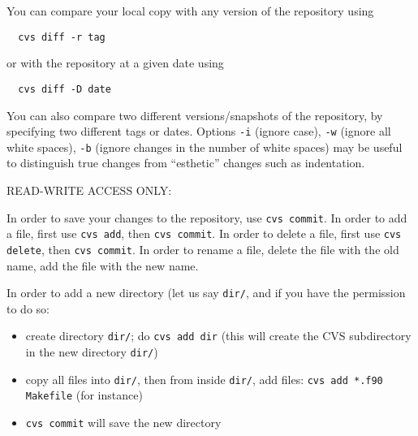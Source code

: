 \documentclass[12pt,a4paper]{article}
\begin{document}
You can compare your local copy with any version of the repository
using 
\begin{verbatim}
  cvs diff -r tag
\end{verbatim}
or with the repository at a given date using 
\begin{verbatim}
  cvs diff -D date
\end{verbatim}
You can also compare two different versions/snapshots of the repository, 
by specifying two different tags or dates. Options \texttt{-i} (ignore case),  
\texttt{-w} (ignore all white spaces), \texttt{-b} (ignore changes in 
the number of white spaces) may be useful to distinguish true changes
from ``esthetic'' changes such as indentation.

READ-WRITE ACCESS ONLY:

In order to save your changes to the repository, use
{\tt cvs commit}. In order to add a file, first use
{\tt cvs add}, then {\tt cvs commit}. In order to delete
a file, first use {\tt cvs delete}, then {\tt cvs commit}.
In order to rename a file, delete the file with the old
name, add the file with the new name.

In order to add a new directory (let us say {\tt dir/}, 
and if you have the permission to do so:
\begin{itemize}
\item create directory {\tt dir/}; do {\tt cvs add dir} (this
will create the CVS subdirectory in the new directory {\tt dir/})
\item 
copy all files into {\tt dir/}, then from inside {\tt dir/}, add files:
{\tt cvs add *.f90 Makefile} (for instance)
\item
{\tt cvs commit} will save the new directory
\end{itemize}
\end{document}
